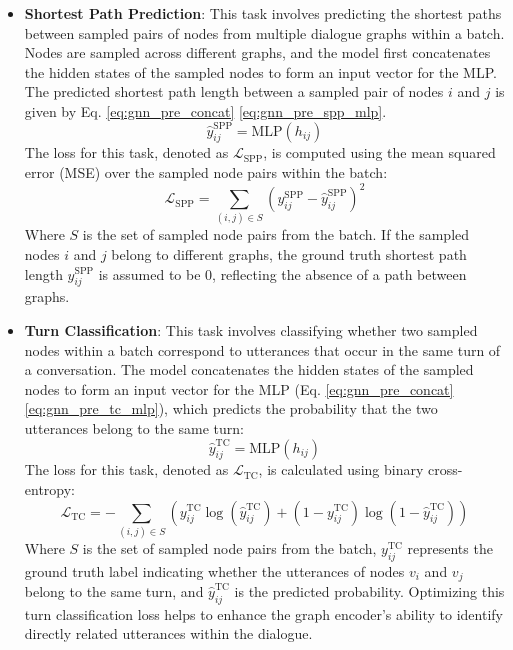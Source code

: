 \begin{itemize}
    \item \textbf{Shortest Path Prediction}: This task involves predicting the shortest paths between sampled pairs of nodes from multiple dialogue graphs within a batch. Nodes are sampled across different graphs, and the model first concatenates the hidden states of the sampled nodes to form an input vector for the MLP. The predicted shortest path length between a sampled pair of nodes \(i\) and \(j\) is given by Eq. \ref{eq:gnn_pre_concat} \ref{eq:gnn_pre_spp_mlp}.
    \begin{equation}\label{eq:gnn_pre_spp_mlp}
        \hat{y}_{ij}^{\text{SPP}} = \text{MLP}(h_{ij})        
    \end{equation}
    The loss for this task, denoted as \( \mathcal{L}_{\text{SPP}} \), is computed using the mean squared error (MSE) over the sampled node pairs within the batch:
    \begin{equation}
        \mathcal{L}_{\text{SPP}} = \sum_{(i, j) \in S} (y_{ij}^{\text{SPP}} - \hat{y}_{ij}^{\text{SPP}})^2
    \end{equation}
    Where \( S \) is the set of sampled node pairs from the batch. If the sampled nodes \(i\) and \(j\) belong to different graphs, the ground truth shortest path length \( y_{ij}^{\text{SPP}} \) is assumed to be 0, reflecting the absence of a path between graphs.

    \item \textbf{Turn Classification}: This task involves classifying whether two sampled nodes within a batch correspond to utterances that occur in the same turn of a conversation. The model concatenates the hidden states of the sampled nodes to form an input vector for the MLP (Eq. \ref{eq:gnn_pre_concat} \ref{eq:gnn_pre_tc_mlp}), which predicts the probability that the two utterances belong to the same turn:
    \begin{equation} \label{eq:gnn_pre_tc_mlp}
        \hat{y}_{ij}^{\text{TC}} = \text{MLP}(h_{ij})
    \end{equation}
    The loss for this task, denoted as \( \mathcal{L}_{\text{TC}} \), is calculated using binary cross-entropy:
    \begin{equation}
        \mathcal{L}_{\text{TC}} = -\sum_{(i, j) \in S} \left( y_{ij}^{\text{TC}} \log(\hat{y}_{ij}^{\text{TC}}) + (1 - y_{ij}^{\text{TC}}) \log(1 - \hat{y}_{ij}^{\text{TC}}) \right)
    \end{equation}
    Where \( S \) is the set of sampled node pairs from the batch, \( y_{ij}^{\text{TC}} \) represents the ground truth label indicating whether the utterances of nodes \( v_i \) and \( v_j \) belong to the same turn, and \( \hat{y}_{ij}^{\text{TC}} \) is the predicted probability. Optimizing this turn classification loss helps to enhance the graph encoder's ability to identify directly related utterances within the dialogue.


\end{itemize}
